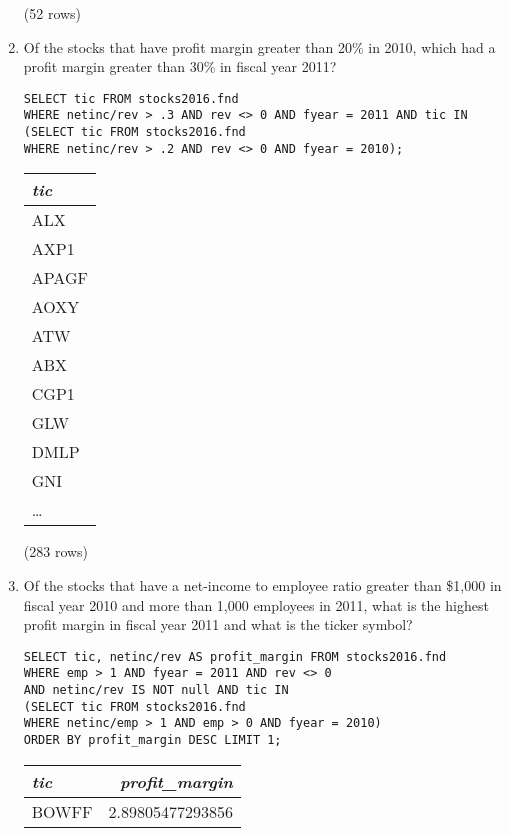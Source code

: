 \documentclass[]{article}
\newenvironment{question}[2][Question]{\begin{trivlist}
\item[\hskip \labelsep {\bfseries #1}\hskip \labelsep {\bfseries #2.}]}{\end{trivlist}}
\begin{document}
\begin{question}{2}
\begin{enumerate}[label=(\alph*)]
\begin{center}
\noindent (52 rows) \\
\end{center}

\item Of the stocks that have profit margin greater than 20\% in 2010, which had a profit margin greater than 30\% in fiscal year 2011?
  \color{blue}
\begin{verbatim}
SELECT tic FROM stocks2016.fnd
WHERE netinc/rev > .3 AND rev <> 0 AND fyear = 2011 AND tic IN
(SELECT tic FROM stocks2016.fnd
WHERE netinc/rev > .2 AND rev <> 0 AND fyear = 2010);
  \end{verbatim}
\color{black}

\begin{center}
\begin{tabular}{l}
\textit{tic} \\
\hline
ALX \\
AXP1 \\
APAGF \\
AOXY \\
ATW \\
ABX \\
CGP1 \\
GLW \\
DMLP \\
GNI \\
\ldots \\
\end{tabular}

\noindent (283 rows) \\
\end{center}

\item Of the stocks that have a net-income to employee ratio greater than \$1,000 in fiscal year 2010 and more than 1,000 employees in 2011, what is the highest profit margin in fiscal year 2011 and what is the ticker symbol?
  \color{blue}
\begin{verbatim}
SELECT tic, netinc/rev AS profit_margin FROM stocks2016.fnd
WHERE emp > 1 AND fyear = 2011 AND rev <> 0
AND netinc/rev IS NOT null AND tic IN
(SELECT tic FROM stocks2016.fnd
WHERE netinc/emp > 1 AND emp > 0 AND fyear = 2010)
ORDER BY profit_margin DESC LIMIT 1;
  \end{verbatim}
\color{black}

\begin{center}
\begin{tabular}{l | r}
\textit{tic} & \textit{profit\_margin} \\
\hline
BOWFF & 2.89805477293856 \\
\end{tabular}


\end{center}
\end{enumerate}
\end{question}
\end{document}
